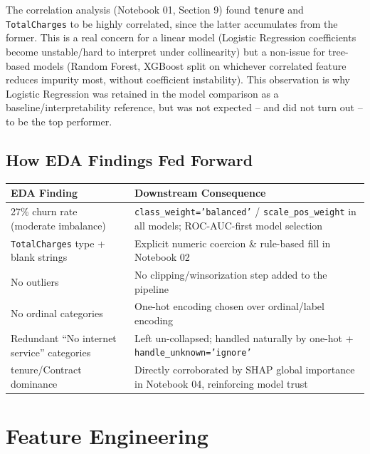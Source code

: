 \documentclass[11pt]{article}
\newcommand{\artifact}[1]{\texttt{\color{navy}#1}}
\begin{document}
The correlation analysis (Notebook 01, Section 9) found \artifact{tenure} and \artifact{TotalCharges} to be highly correlated, since the latter accumulates from the former. This is a real concern for a linear model (Logistic Regression coefficients become unstable/hard to interpret under collinearity) but a non-issue for tree-based models (Random Forest, XGBoost split on whichever correlated feature reduces impurity most, without coefficient instability). This observation is why Logistic Regression was retained in the model comparison as a baseline/interpretability reference, but was not expected -- and did not turn out -- to be the top performer.

\subsection{How EDA Findings Fed Forward}

\begin{center}
\begin{tabularx}{\textwidth}{@{}l X@{}}
\toprule
\textbf{EDA Finding} & \textbf{Downstream Consequence} \\
\midrule
27\% churn rate (moderate imbalance) & \texttt{class\_weight='balanced'} / \texttt{scale\_pos\_weight} in all models; ROC-AUC-first model selection \\
\artifact{TotalCharges} type + blank strings & Explicit numeric coercion \& rule-based fill in Notebook 02 \\
No outliers & No clipping/winsorization step added to the pipeline \\
No ordinal categories & One-hot encoding chosen over ordinal/label encoding \\
Redundant ``No internet service'' categories & Left un-collapsed; handled naturally by one-hot + \texttt{handle\_unknown='ignore'} \\
tenure/Contract dominance & Directly corroborated by SHAP global importance in Notebook 04, reinforcing model trust \\
\bottomrule
\end{tabularx}
\end{center}

\section{Feature Engineering}
\end{document}

